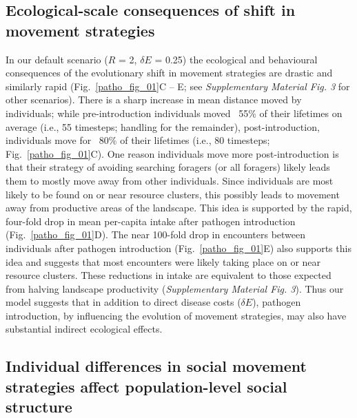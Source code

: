 \subsection*{Ecological-scale consequences of shift in movement strategies}

In our default scenario ($R$ = 2, $\delta E$ = 0.25) the ecological and behavioural consequences of the evolutionary shift in movement strategies are drastic and similarly rapid (Fig.~\ref{patho_fig_01}C -- E; see \textit{Supplementary Material Fig. 3} for other scenarios).
There is a sharp increase in mean distance moved by individuals; while pre-introduction individuals moved ~55\% of their lifetimes on average (i.e., 55 timesteps; handling for the remainder), post-introduction, individuals move for ~80\% of their lifetimes (i.e., 80 timesteps; Fig.~\ref{patho_fig_01}C).
One reason individuals move more post-introduction is that their strategy of avoiding searching foragers (or all foragers) likely leads them to mostly move away from other individuals.
Since individuals are most likely to be found on or near resource clusters, this possibly leads to movement away from productive areas of the landscape.
This idea is supported by the rapid, four-fold drop in mean per-capita intake after pathogen introduction (Fig.~\ref{patho_fig_01}D).
The near 100-fold drop in encounters between individuals after pathogen introduction (Fig.~\ref{patho_fig_01}E) also supports this idea and suggests that most encounters were likely taking place on or near resource clusters.
These reductions in intake are equivalent to those expected from halving landscape productivity (\textit{Supplementary Material Fig. 3}).
Thus our model suggests that in addition to direct disease costs ($\delta E$), pathogen introduction, by influencing the evolution of movement strategies, may also have substantial indirect ecological effects.

\subsection*{Individual differences in social movement strategies affect population-level social structure}


